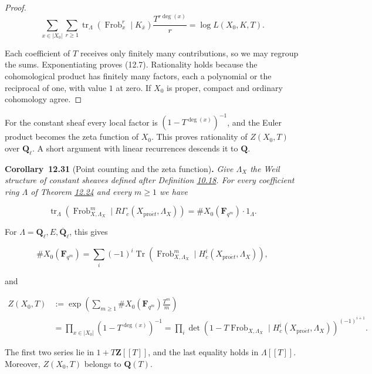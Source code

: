 \documentclass[11pt]{article}
\newenvironment{bpstatement}[2]{\par\addvspace{0.6\baselineskip}\noindent\textbf{#1}#2\textbf{.}\enspace\ignorespaces}
  {\par\addvspace{0.4\baselineskip}}
\newenvironment{bpstatementit}[2]{\begin{bpstatement}{#1}{#2}\itshape\ignorespaces}{\end{bpstatement}}
\begin{document}
\begin{proof}[{Proof}]
\[
\sum_{x\in|X_0|}\sum_{r\geq1}
\operatorname{tr}_{\Lambda}(\operatorname{Frob}_x^r\mid K_{\bar x})
\frac{T^{r\deg(x)}}{r}
=\log L(X_0,K,T).
\]

Each coefficient of \(T\) receives only finitely many contributions, so we may regroup the sums. Exponentiating proves (12.7). Rationality holds because the cohomological product has finitely many factors, each a polynomial or the reciprocal of one, with value \(1\) at zero. If \(X_0\) is proper, compact and ordinary cohomology agree.
\end{proof}

\label{bp319}%
For the constant sheaf every local factor is \((1-T^{\deg(x)})^{-1}\), and the Euler product becomes the zeta function of \(X_0\). This proves rationality of \(Z(X_0,T)\) over \(\mathbf Q_\ell\). A short argument with linear recurrences descends it to \(\mathbf Q\).

\label{bp320}%
\begin{bpstatementit}{Corollary~12.31}{ (Point counting and the zeta function)}
Give \(\Lambda_X\) the Weil structure of constant sheaves defined after Definition \hyperref[bp156]{10.18}. For every coefficient ring \(\Lambda\) of Theorem \hyperref[bp298]{12.24} and every \(m\geq1\) we have

\[
\operatorname{tr}_{\Lambda}
(\operatorname{Frob}_{X,\Lambda_X}^m\mid R\Gamma_c(X_{\mathrm{pro}\acute{e}t},\Lambda_X))
=\#X_0(\mathbf F_{q^m})\cdot1_{\Lambda}.
\tag{12.9}
\]

For \(\Lambda=\mathbf Q_\ell,E,\overline{\mathbf Q}_\ell\), this gives

\[
\#X_0(\mathbf F_{q^m})
=\sum_i(-1)^i\operatorname{Tr}
(\operatorname{Frob}_{X,\Lambda_X}^m\mid H_c^i(X_{\mathrm{pro}\acute{e}t},\Lambda_X)),
\]

and

\[
\begin{aligned}
Z(X_0,T)
&:=\exp\left(\sum_{m\geq1}
\#X_0(\mathbf F_{q^m})\frac{T^m}{m}\right)\\
&=\prod_{x\in|X_0|}(1-T^{\deg(x)})^{-1}
=\prod_i\det(1-T\operatorname{Frob}_{X,\Lambda_X}\mid H_c^i(X_{\mathrm{pro}\acute{e}t},\Lambda_X))^{(-1)^{i+1}}.
\end{aligned}
\]

The first two series lie in \(1+T\mathbf Z[[T]]\), and the last equality holds in \(\Lambda[[T]]\). Moreover, \(Z(X_0,T)\) belongs to \(\mathbf Q(T)\).
\end{bpstatementit}
\end{document}
